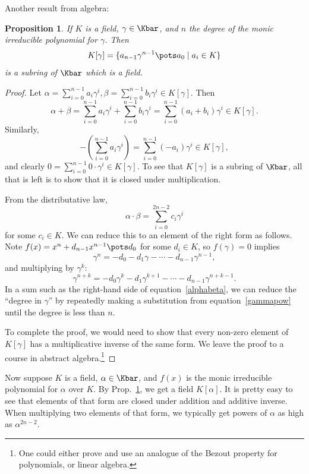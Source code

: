 \documentclass[12pt]{amsart}
\theoremstyle{plain}
\newtheorem{prop}[thm]{Proposition}
\theoremstyle{definition}
\theoremstyle{remark}
\begin{document}
Another result from algebra:
\begin{prop} \label{ext-field}
  If $K$ is a field, $\gamma\in \Kbar$, and $n$ the degree of the monic
  irreducible polynomial for $\gamma$.  Then
  \[ K[\gamma]= \{a_{n-1}\gamma^{n-1}\pots a_0 \mid a_i\in K\}\]
  is a subring of $\Kbar$ which is a field.
\end{prop}
\begin{proof}
  Let $\alpha=\sum_{i=0}^{n-1} a_i \gamma^i, \beta=\sum_{i=0}^{n-1} b_i \gamma^i\in
  K[\gamma]$.  Then
  \[ \alpha+\beta=\sum_{i=0}^{n-1} a_i \gamma^i+\sum_{i=0}^{n-1} b_i
  \gamma^i =\sum_{i=0}^{n-1} (a_i+b_i) \gamma^i \in K[\gamma].\]
Similarly,
\[ -\left(\sum_{i=0}^{n-1} a_i \gamma^i\right)=\sum_{i=0}^{n-1} (-a_i)
\gamma^i\in K[\gamma],\]
and clearly $0=\sum_{i=0}^{n-1} 0\cdot \gamma^i\in K[\gamma]$.  To see
that $K[\gamma]$ is a subring of $\Kbar$, all that is left is to show
that it is closed under multiplication.

From the distributative law,
\begin{equation} \label{alphabeta}
 \alpha\cdot\beta = \sum_{i=0}^{2n-2} c_i \gamma^i
\end{equation}
for some $c_i\in K$.  We can reduce this to an element of the right
form as follows.  Note $f(x)=x^n+d_{n-1}x^{n-1}\pots d_0$ for some
$d_i\in K$, so $f(\gamma)=0$ implies
\[ \gamma^n = -d_0-d_1\gamma-\cdots -d_{n-1}\gamma^{n-1},\]
and multiplying by $\gamma^k$:
\begin{equation}\label{gammapow}
 \gamma^{n+k} = -d_0\gamma^k-d_1\gamma^{k+1}-\cdots
-d_{n-1}\gamma^{n+k-1}.
\end{equation}
In a sum such as the right-hand side of equation~\eqref{alphabeta}, we
can reduce the ``degree in $\gamma$'' by repeatedly making a
substitution from equation~\eqref{gammapow} until the degree is less
than $n$.

To complete the proof, we would need to show that every non-zero
element of $K[\gamma]$ has a multiplicative inverse of the same form.
We leave the proof to a course in abstract algebra.\footnote{One could
  either prove and use an analogue of the Bezout property for
  polynomials, or linear algebra.}
\end{proof}
Now suppose $K$ is a field, $\alpha\in\Kbar$, and $f(x)$ is the monic
irreducible polynomial for $\alpha$ over $K$.  By
Prop.~\ref{ext-field}, we get a field $K[\alpha]$.  It is pretty easy
to see that elements of that form are closed under addition and
additive inverse.  When multiplying two elements of that form, we
typically get powers of $\alpha$ as high as $\alpha^{2n-2}$.
\end{document}
